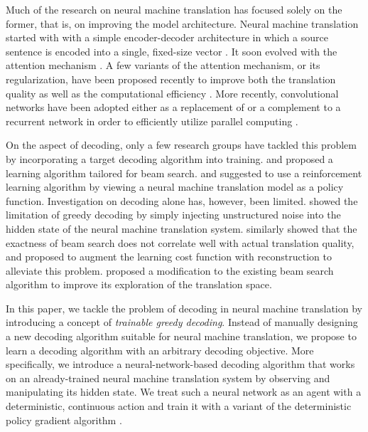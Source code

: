 Much of the research on neural machine translation has focused solely on the former, that is, on improving the model architecture. Neural machine translation started with with a simple encoder-decoder architecture in which a source sentence is encoded into a single, fixed-size vector \citep{cho2014learning,sutskever2014sequence,kalchbrenner2013recurrent}. 
It soon evolved with the attention mechanism \citep{bahdanau2014neural}. 
A few variants of the attention mechanism, or its regularization, have been proposed recently to improve both the translation quality as well as the computational efficiency \citep{luong2015effective,cohn2016incorporating,tu2016modeling}. 
More recently, convolutional networks have been adopted either as a replacement of or a complement to a recurrent network in order to efficiently utilize parallel computing 
\citep{kalchbrenner2016neural,lee2016fully,gehring2016convolutional}.

On the aspect of decoding, only a few research groups have tackled this problem by incorporating a target decoding algorithm into training. \citet{wiseman2016sequence} and \citet{shen2015minimum} proposed a learning algorithm tailored for beam search. \citet{ranzato2015sequence} and \cite{bahdanau2016actor} suggested to use a reinforcement learning algorithm by viewing a neural machine translation model as a policy function.
Investigation on decoding alone has, however, been limited. \citet{cho2016noisy} showed the limitation of greedy decoding by simply injecting unstructured noise into the hidden state of the neural machine translation system. \citet{tu2016neural} similarly showed that the exactness of beam search does not correlate well with actual translation quality, and proposed to augment the learning cost function with reconstruction to alleviate this problem. \citet{li2016simple} proposed a modification to the existing beam search algorithm to improve its exploration of the translation space. 

In this paper, we tackle the problem of decoding in neural machine translation by introducing a concept of {\it trainable greedy decoding}. Instead of manually designing a new decoding algorithm suitable for neural machine translation, we propose to learn a decoding algorithm with an arbitrary decoding objective. More specifically, we introduce a neural-network-based decoding algorithm that works on an already-trained neural machine translation system by observing and manipulating its hidden state. We treat such a neural network as an agent with a deterministic, continuous action and train it with a variant of the deterministic policy gradient algorithm \citep{silver2014deterministic}. 

